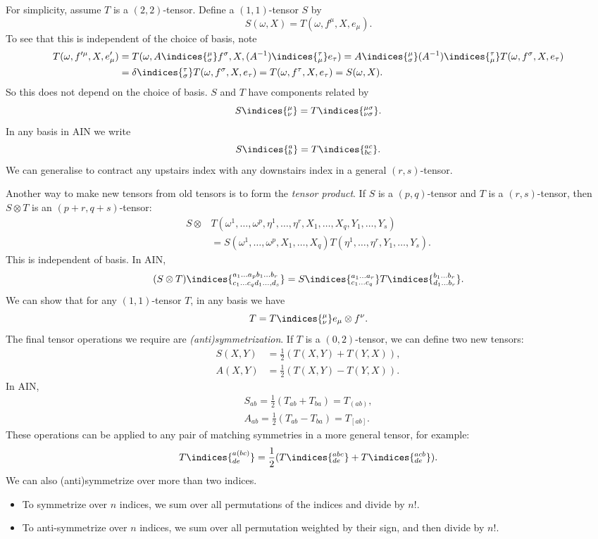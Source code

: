 \documentclass[12pt]{article}
\begin{document}
For simplicity, assume $T$ is a $(2, 2)$-tensor. Define a $(1, 1)$-tensor $S$ by
\[
S(\omega, X) = T(\omega, f^\mu, X, e_\mu).
\]
To see that this is independent of the choice of basis, note
\begin{align*}
	T(\omega, f'^\mu, X, e'_\mu) &= T(\omega, A\indices{^{\mu}_{\sigma}} f^\sigma, X, (A^{-1})\indices{^{\tau}_{\mu}} e_\tau ) = A\indices{^{\mu}_{\sigma}} (A^{-1})\indices{^{\tau}_{\mu}} T(\omega, f^\sigma, X, e_\tau) \\
				     &= \delta\indices{^{\tau}_{\sigma}} T(\omega, f^\sigma, X, e_\tau) = T(\omega, f^\tau, X, e_\tau) = S(\omega, X).
\end{align*}
So this does not depend on the choice of basis. $S$ and $T$ have components related by
\[
S\indices{^{\mu}_{\nu}} = T\indices{^{\mu\sigma}_{\nu\sigma}}.
\]
In any basis in AIN we write
\[
S\indices{^{a}_{b}} = T\indices{^{ac}_{bc}}.
\]
We can generalise to contract any upstairs index with any downstairs index in a general $(r, s)$-tensor.

Another way to make new tensors from old tensors is to form the \emph{tensor product}. If $S$ is a $(p, q)$-tensor and $T$ is a $(r, s)$-tensor, then $S \otimes T$ is an $(p + r, q + s)$-tensor:
\begin{align*}
	S \otimes &T(\omega^1, \ldots, \omega^p, \eta^1, \ldots, \eta^r, X_1, \ldots, X_q, Y_1, \ldots, Y_s) \\
		  &= S(\omega^1, \ldots, \omega^p, X_1, \ldots, X_q) T(\eta^1, \ldots, \eta^r, Y_1, \ldots, Y_s).
\end{align*}
This is independent of basis. In AIN,
\[
	(S \otimes T)\indices{^{a_1\ldots a_p b_1 \ldots b_r}_{c_1 \ldots c_q d_1 \ldots, d_s}} = S\indices{^{a_1 \ldots a_r}_{ c_1 \ldots c_q}} T\indices{^{b_1 \ldots b_r}_{d_1 \ldots b_r}}.
\]
We can show that for any $(1, 1)$-tensor $T$, in any basis we have
\[
T = T\indices{^{\mu}_{\nu}} e_\mu \otimes f^\nu.
\]
The final tensor operations we require are \emph{(anti)symmetrization}. If $T$ is a $(0, 2)$-tensor, we can define two new tensors:
\begin{align*}
	S(X, Y) &= \frac{1}{2}(T(X, Y) + T(Y, X)), \\
	A(X, Y) &= \frac{1}{2} (T(X, Y) - T(Y, X)).
\end{align*}
In AIN,
\begin{align*}
	S_{ab} = \frac{1}{2} (T_{ab} + T_{ba}) = T_{(ab)}, \\
	A_{ab} = \frac{1}{2} (T_{ab} - T_{ba}) = T_{[ab]}.
\end{align*}
These operations can be applied to any pair of matching symmetries in a more general tensor, for example:
\[
T\indices{^{a(bc)}_{de}} = \frac{1}{2} (T\indices{^{abc}_{de}} + T\indices{^{acb}_{de}}).
\]
We can also (anti)symmetrize over more than two indices.
\begin{itemize}
	\item To symmetrize over $n$ indices, we sum over all permutations of the indices and divide by $n!$.
	\item To anti-symmetrize over $n$ indices, we sum over all permutation weighted by their sign, and then divide by $n!$.
\end{itemize}
\end{document}
